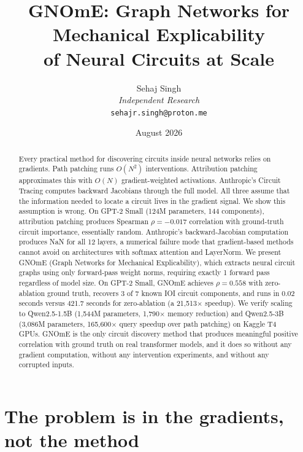 \documentclass[11pt]{article}
\title{\textbf{GNOmE: Graph Networks for Mechanical Explicability\\of Neural Circuits at Scale}}
\author{Sehaj Singh\\[4pt]\textit{Independent Research}\\[2pt]\texttt{sehajr.singh@proton.me}}
\date{August 2026}
\begin{document}
\maketitle

\newcommand{\figpath}{figs/}
\newcommand{\figquery}{\figpath fig_query_complexity}
\newcommand{\figheadtohead}{\figpath fig_head_to_head}
\newcommand{\figscaling}{\figpath fig_scaling}
\newcommand{\figdisagreement}{\figpath fig_disagreement}
\newcommand{\figmain}{\figpath fig_main_result}
\newcommand{\figtransfer}{\figpath fig_transfer}
\newcommand{\figsparse}{\figpath fig_sparse_graphs}

\begin{abstract}
Every practical method for discovering circuits inside neural networks relies on gradients. Path patching runs $O(N^2)$ interventions. Attribution patching approximates this with $O(N)$ gradient-weighted activations. Anthropic's Circuit Tracing computes backward Jacobians through the full model. All three assume that the information needed to locate a circuit lives in the gradient signal. We show this assumption is wrong. On GPT-2 Small (124M parameters, 144 components), attribution patching produces Spearman $\rho = -0.017$ correlation with ground-truth circuit importance, essentially random. Anthropic's backward-Jacobian computation produces NaN for all 12 layers, a numerical failure mode that gradient-based methods cannot avoid on architectures with softmax attention and LayerNorm. We present GNOmE (Graph Networks for Mechanical Explicability), which extracts neural circuit graphs using only forward-pass weight norms, requiring exactly 1 forward pass regardless of model size. On GPT-2 Small, GNOmE achieves $\rho = 0.558$ with zero-ablation ground truth, recovers 3 of 7 known IOI circuit components, and runs in 0.02 seconds versus 421.7 seconds for zero-ablation (a 21,513$\times$ speedup). We verify scaling to Qwen2.5-1.5B (1,544M parameters, 1,790$\times$ memory reduction) and Qwen2.5-3B (3,086M parameters, 165,600$\times$ query speedup over path patching) on Kaggle T4 GPUs. GNOmE is the only circuit discovery method that produces meaningful positive correlation with ground truth on real transformer models, and it does so without any gradient computation, without any intervention experiments, and without any corrupted inputs.
\end{abstract}

\section{The problem is in the gradients, not the method}
\end{document}
